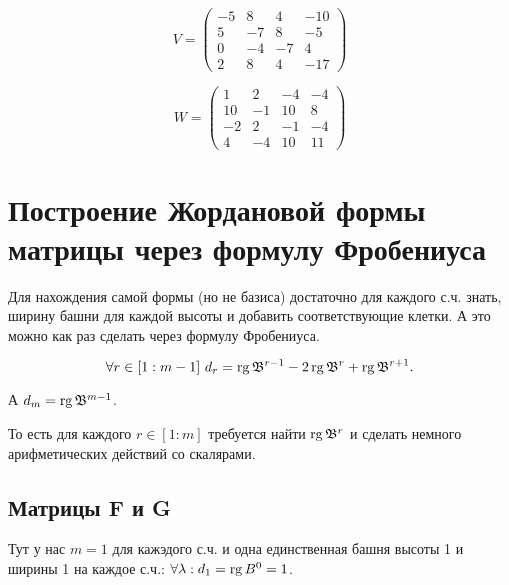 \documentclass[12pt, a4paper]{article}
\begin{document}
\begin{statement}
        \begin{equation}
            V = \left(\begin{matrix}
                -5 & 8 & 4 & -10 \\
                5 & -7 & 8 & -5 \\
                0 & -4 & -7 & 4 \\
                2 & 8 & 4 & -17
            \end{matrix}\right)
        \end{equation}

        
        \begin{equation}
            W = \left(\begin{matrix}
                1 & 2 & -4 & -4 \\
                10 & -1 & 10 & 8 \\
                -2 & 2 & -1 & -4 \\
                4 & -4 & 10 & 11
            \end{matrix}\right)
        \end{equation}
    \end{statement}

    \section{Построение Жордановой формы матрицы через формулу Фробениуса}

    Для нахождения самой формы (но не базиса) достаточно для каждого с.ч. знать, ширину башни для каждой высоты и добавить соответствующие клетки.
    А это можно как раз сделать через формулу Фробениуса.

    \begin{equation}
        \forall r\in[1:m-1]~d_r=\operatorname{rg}\mathfrak{B}^{r-1}-2\operatorname{rg}\mathfrak{B}^{r}+\operatorname{rg}\mathfrak{B}^{r + 1}.
    \end{equation}

    А $d_m=\operatorname{rg}\mathfrak{B}^{m-1}$.

    То есть для каждого $r\in[1:m]$ требуется найти $\operatorname{rg} \mathfrak{B}^r$ 
    и сделать немного арифметических действий со скалярами.

    \subsection{Матрицы F и G}

    Тут у нас $m = 1$ для кажэдого с.ч. и одна единственная башня высоты 1 и ширины 1 на каждое с.ч.: 
    $\forall \lambda: d_1 = \operatorname{rg} B^0 = 1$.
\end{document}
